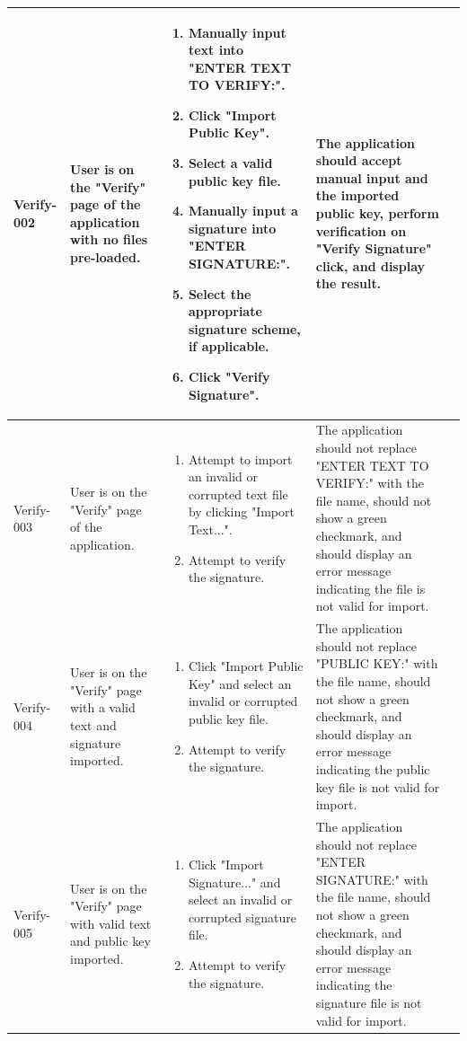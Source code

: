 \documentclass[]{final_report}
\theoremstyle{definition}
\begin{document}
\begin{longtable}{|p{1.2cm}|p{3cm}|p{3cm}|p{4cm}|p{4cm}|}
   Verify-002 & User is on the "Verify" page of the application with no files pre-loaded. & 
  \begin{enumerate}
    \item Manually input text into "ENTER TEXT TO VERIFY:".
    \item Click "Import Public Key".
    \item Select a valid public key file.
    \item Manually input a signature into "ENTER SIGNATURE:".
    \item Select the appropriate signature scheme, if applicable.
    \item Click "Verify Signature".
  \end{enumerate}
  & The application should accept manual input and the imported public key, perform verification on "Verify Signature" click, and display the result. & \\
  \hline
  Verify-003 & User is on the "Verify" page of the application. & 
  \begin{enumerate}
    \item Attempt to import an invalid or corrupted text file by clicking "Import Text...".
    \item Attempt to verify the signature.
  \end{enumerate}
  & The application should not replace "ENTER TEXT TO VERIFY:" with the file name, should not show a green checkmark, and should display an error message indicating the file is not valid for import. & \\
  \hline
  Verify-004 & User is on the "Verify" page with a valid text and signature imported. & 
  \begin{enumerate}
    \item Click "Import Public Key" and select an invalid or corrupted public key file.
    \item Attempt to verify the signature.
  \end{enumerate}
  & The application should not replace "PUBLIC KEY:" with the file name, should not show a green checkmark, and should display an error message indicating the public key file is not valid for import. & \\
  \hline
  Verify-005 & User is on the "Verify" page with valid text and public key imported. & 
  \begin{enumerate}
    \item Click "Import Signature..." and select an invalid or corrupted signature file.
    \item Attempt to verify the signature.
  \end{enumerate}
  & The application should not replace "ENTER SIGNATURE:" with the file name, should not show a green checkmark, and should display an error message indicating the signature file is not valid for import. & \\
  \hline
\end{longtable}




\newpage

\printbibliography
\label{endpage}
\end{document}
